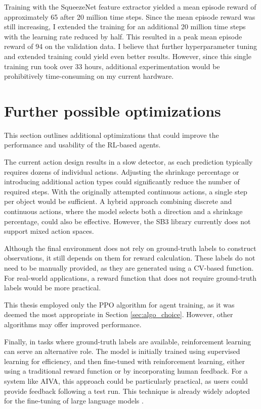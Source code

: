 \documentclass[
  digital,     %
  oneside,     %
  nosansbold,  %
  nocolorbold, %
  lof,         %
  lot,         %
]{fithesis4}
\begin{document}
Training with the SqueezeNet feature extractor yielded a mean episode reward of approximately 65 after 20 million time steps. Since the mean episode reward was still increasing, I extended the training for an additional 20 million time steps with the learning rate reduced by half. This resulted in a peak mean episode reward of 94 on the validation data. I believe that further hyperparameter tuning and extended training could yield even better results. However, since this single training run took over 33 hours, additional experimentation would be prohibitively time-consuming on my current hardware.

\section{Further possible optimizations}
\label{sec:further_optim}

This section outlines additional optimizations that could improve the performance and usability of the RL-based agents.

The current action design results in a slow detector, as each prediction typically requires dozens of individual actions. Adjusting the shrinkage percentage or introducing additional action types could significantly reduce the number of required steps. With the originally attempted continuous actions, a single step per object would be sufficient. A hybrid approach combining discrete and continuous actions, where the model selects both a direction and a shrinkage percentage, could also be effective. However, the SB3 library currently does not support mixed action spaces.

Although the final environment does not rely on ground-truth labels to construct observations, it still depends on them for reward calculation. These labels do not need to be manually provided, as they are generated using a CV-based function. For real-world applications, a reward function that does not require ground-truth labels would be more practical.

This thesis employed only the PPO algorithm for agent training, as it was deemed the most appropriate in Section \ref{sec:algo_choice}. However, other algorithms may offer improved performance.

Finally, in tasks where ground-truth labels are available, reinforcement learning can serve an alternative role. The model is initially trained using supervised learning for efficiency, and then fine-tuned with reinforcement learning, either using a traditional reward function or by incorporating human feedback. For a system like AIVA, this approach could be particularly practical, as users could provide feedback following a test run. This technique is already widely adopted for the fine-tuning of large language models \cite{LLM-RLHF}.
\end{document}
